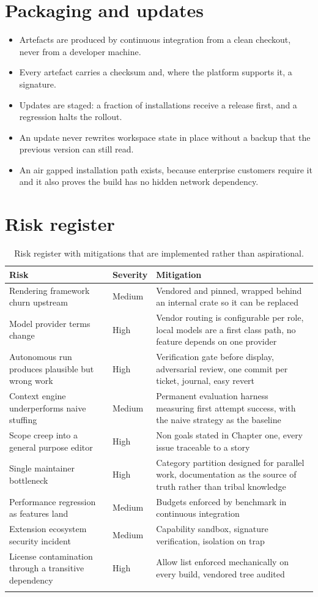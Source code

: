 \section{Packaging and updates}

\begin{itemize}
  \item Artefacts are produced by continuous integration from a clean checkout, never from a
  developer machine.
  \item Every artefact carries a checksum and, where the platform supports it, a signature.
  \item Updates are staged: a fraction of installations receive a release first, and a
  regression halts the rollout.
  \item An update never rewrites workspace state in place without a backup that the previous
  version can still read.
  \item An air gapped installation path exists, because enterprise customers require it and
  it also proves the build has no hidden network dependency.
\end{itemize}

\section{Risk register}

\begin{longtable}{@{}p{} p{} p{}@{}}
\toprule
\textbf{Risk} & \textbf{Severity} & \textbf{Mitigation} \\
\midrule
\endhead
Rendering framework churn upstream & Medium & Vendored and pinned, wrapped behind an internal crate so it can be replaced \\
Model provider terms change & High & Vendor routing is configurable per role, local models are a first class path, no feature depends on one provider \\
Autonomous run produces plausible but wrong work & High & Verification gate before display, adversarial review, one commit per ticket, journal, easy revert \\
Context engine underperforms naive stuffing & Medium & Permanent evaluation harness measuring first attempt success, with the naive strategy as the baseline \\
Scope creep into a general purpose editor & High & Non goals stated in Chapter one, every issue traceable to a story \\
Single maintainer bottleneck & High & Category partition designed for parallel work, documentation as the source of truth rather than tribal knowledge \\
Performance regression as features land & Medium & Budgets enforced by benchmark in continuous integration \\
Extension ecosystem security incident & Medium & Capability sandbox, signature verification, isolation on trap \\
License contamination through a transitive dependency & High & Allow list enforced mechanically on every build, vendored tree audited \\
\bottomrule
\caption{Risk register with mitigations that are implemented rather than aspirational.}
\end{longtable}
